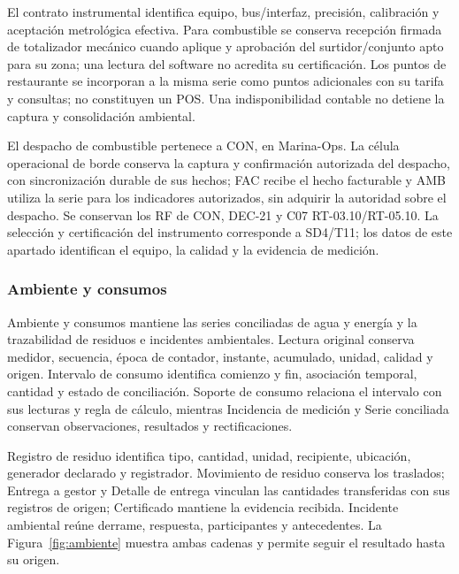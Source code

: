 El contrato instrumental identifica equipo, bus/interfaz, precisión, calibración y aceptación metrológica efectiva. Para combustible se conserva recepción firmada de totalizador mecánico cuando aplique y aprobación del surtidor/conjunto apto para su zona; una lectura del software no acredita su certificación. Los puntos de restaurante se incorporan a la misma serie como puntos adicionales con su tarifa y consultas; no constituyen un POS. Una indisponibilidad contable no detiene la captura y consolidación ambiental.

El despacho de combustible pertenece a CON, en Marina-Ops. La célula operacional de borde conserva la captura y confirmación autorizada del despacho, con sincronización durable de sus hechos; FAC recibe el hecho facturable y AMB utiliza la serie para los indicadores autorizados, sin adquirir la autoridad sobre el despacho. Se conservan los RF de CON, DEC-21 y C07 RT-03.10/RT-05.10. La selección y certificación del instrumento corresponde a SD4/T11; los datos de este apartado identifican el equipo, la calidad y la evidencia de medición.

\subsubsection{Ambiente y consumos}
Ambiente y consumos mantiene las series conciliadas de agua y energía y la trazabilidad de residuos e incidentes ambientales. Lectura original conserva medidor, secuencia, época de contador, instante, acumulado, unidad, calidad y origen. Intervalo de consumo identifica comienzo y fin, asociación temporal, cantidad y estado de conciliación. Soporte de consumo relaciona el intervalo con sus lecturas y regla de cálculo, mientras Incidencia de medición y Serie conciliada conservan observaciones, resultados y rectificaciones.

Registro de residuo identifica tipo, cantidad, unidad, recipiente, ubicación, generador declarado y registrador. Movimiento de residuo conserva los traslados; Entrega a gestor y Detalle de entrega vinculan las cantidades transferidas con sus registros de origen; Certificado mantiene la evidencia recibida. Incidente ambiental reúne derrame, respuesta, participantes y antecedentes. La Figura~\ref{fig:ambiente} muestra ambas cadenas y permite seguir el resultado hasta su origen.

